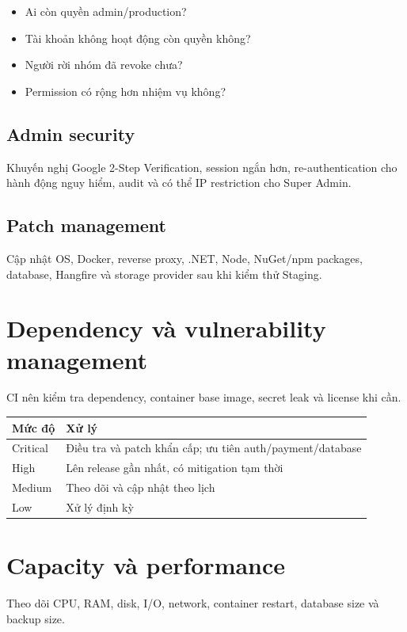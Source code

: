 \documentclass[11pt,a4paper]{article}
\begin{document}
\begin{itemize}
  \item Ai còn quyền admin/production?
  \item Tài khoản không hoạt động còn quyền không?
  \item Người rời nhóm đã revoke chưa?
  \item Permission có rộng hơn nhiệm vụ không?
\end{itemize}

\subsection{Admin security}

Khuyến nghị Google 2-Step Verification, session ngắn hơn, re-authentication cho hành động nguy hiểm, audit và có thể IP restriction cho Super Admin.

\subsection{Patch management}

Cập nhật OS, Docker, reverse proxy, .NET, Node, NuGet/npm packages, database, Hangfire và storage provider sau khi kiểm thử Staging.

\section{Dependency và vulnerability management}

CI nên kiểm tra dependency, container base image, secret leak và license khi cần.

\begin{longtable}{L{0.18\textwidth}L{0.74\textwidth}}
\toprule
\textbf{Mức độ} & \textbf{Xử lý} \\
\midrule
Critical & Điều tra và patch khẩn cấp; ưu tiên auth/payment/database \\
High & Lên release gần nhất, có mitigation tạm thời \\
Medium & Theo dõi và cập nhật theo lịch \\
Low & Xử lý định kỳ \\
\bottomrule
\end{longtable}

\section{Capacity và performance}

Theo dõi CPU, RAM, disk, I/O, network, container restart, database size và backup size.
\end{document}
